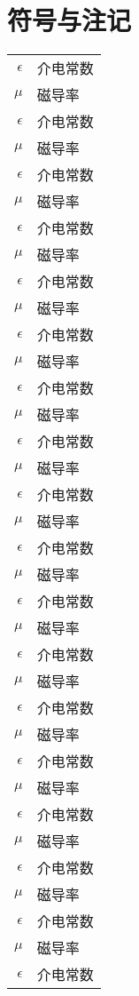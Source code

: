 \chapter{符号与注记}

\begin{longtable}{rl}
  $\epsilon$ & 介电常数 \\
  $\mu$      & 磁导率  \\
  $\epsilon$ & 介电常数 \\
  $\mu$      & 磁导率  \\
  $\epsilon$ & 介电常数 \\
  $\mu$      & 磁导率  \\
  $\epsilon$ & 介电常数 \\
  $\mu$      & 磁导率  \\
  $\epsilon$ & 介电常数 \\
  $\mu$      & 磁导率  \\
  $\epsilon$ & 介电常数 \\
  $\mu$      & 磁导率  \\
  $\epsilon$ & 介电常数 \\
  $\mu$      & 磁导率  \\
  $\epsilon$ & 介电常数 \\
  $\mu$      & 磁导率  \\
  $\epsilon$ & 介电常数 \\
  $\mu$      & 磁导率  \\
  $\epsilon$ & 介电常数 \\
  $\mu$      & 磁导率  \\
  $\epsilon$ & 介电常数 \\
  $\mu$      & 磁导率  \\
  $\epsilon$ & 介电常数 \\
  $\mu$      & 磁导率  \\
  $\epsilon$ & 介电常数 \\
  $\mu$      & 磁导率  \\
  $\epsilon$ & 介电常数 \\
  $\mu$      & 磁导率  \\
  $\epsilon$ & 介电常数 \\
  $\mu$      & 磁导率  \\
  $\epsilon$ & 介电常数 \\
  $\mu$      & 磁导率  \\
  $\epsilon$ & 介电常数 \\
  $\mu$      & 磁导率  \\
  $\epsilon$ & 介电常数 \\

\end{longtable}
